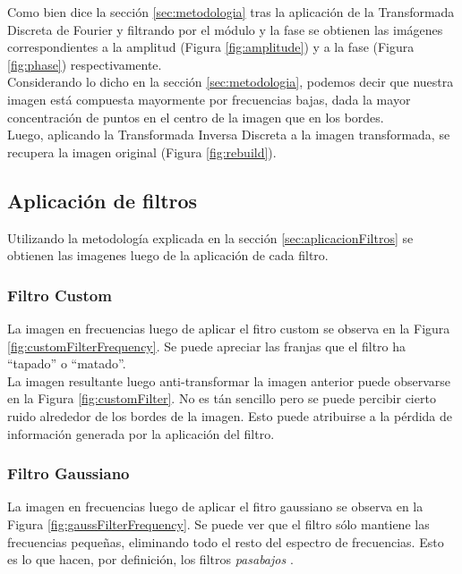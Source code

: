 \documentclass[twocolumn,a4paper,10pt]{article}
\begin{document}
Como bien dice la secci\'on \ref{sec:metodologia}
tras la aplicaci\'on de la Transformada Discreta de Fourier y filtrando por el m\'odulo y la fase se obtienen las im\'agenes correspondientes a la amplitud
(Figura \ref{fig:amplitude}) y a la fase (Figura \ref{fig:phase}) respectivamente. \\

 Considerando lo dicho en la secci\'on \ref{sec:metodologia}, podemos decir que 
nuestra imagen est\'a compuesta
mayormente por frecuencias bajas, dada la mayor concentraci\'on de puntos en el centro de la imagen que en los bordes.\\

Luego, aplicando la Transformada Inversa Discreta a la imagen transformada, se recupera la imagen original (Figura \ref{fig:rebuild}).

\subsection{Aplicaci\'on de filtros}

Utilizando la metodolog\'ia explicada en la secci\'on \ref{sec:aplicacionFiltros}
se obtienen las imagenes luego de la aplicaci\'on de cada filtro. \\

\subsubsection{Filtro Custom}

La imagen en frecuencias luego de aplicar el fitro custom se observa en la Figura \ref{fig:customFilterFrequency}. Se puede apreciar 
las franjas que el filtro ha ``tapado'' o ``matado''. \\

La imagen resultante luego anti-transformar la imagen anterior puede observarse en la Figura \ref{fig:customFilter}. No es t\'an sencillo pero 
se puede percibir cierto ruido alrededor de los bordes de la imagen. Esto puede atribuirse a la p\'erdida de informaci\'on generada por la aplicaci\'on
del filtro.

\subsubsection{Filtro Gaussiano}
La imagen en frecuencias luego de aplicar el fitro gaussiano se observa en la Figura \ref{fig:gaussFilterFrequency}. Se puede ver que el filtro s\'olo mantiene
las frecuencias pequeñas, eliminando todo el resto del espectro de frecuencias. Esto es lo que hacen, por definici\'on,
los filtros \textit{pasabajos} \cite{Wikipedia_FiltroPasabajo}. \\
\end{document}
